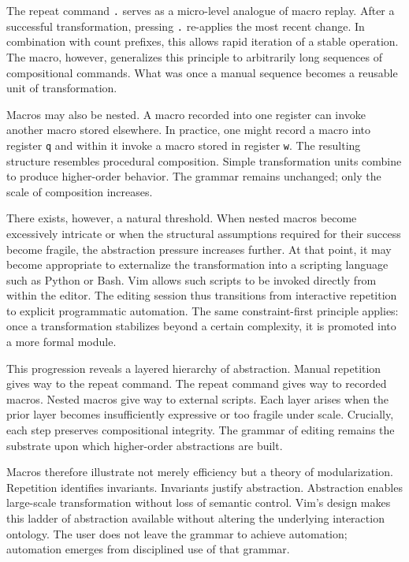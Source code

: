 \documentclass[12pt]{article}
\begin{document}
The repeat command \texttt{.} serves as a micro-level analogue of macro replay. After a successful transformation, pressing \texttt{.} re-applies the most recent change. In combination with count prefixes, this allows rapid iteration of a stable operation. The macro, however, generalizes this principle to arbitrarily long sequences of compositional commands. What was once a manual sequence becomes a reusable unit of transformation.

Macros may also be nested. A macro recorded into one register can invoke another macro stored elsewhere. In practice, one might record a macro into register \texttt{q} and within it invoke a macro stored in register \texttt{w}. The resulting structure resembles procedural composition. Simple transformation units combine to produce higher-order behavior. The grammar remains unchanged; only the scale of composition increases.

There exists, however, a natural threshold. When nested macros become excessively intricate or when the structural assumptions required for their success become fragile, the abstraction pressure increases further. At that point, it may become appropriate to externalize the transformation into a scripting language such as Python or Bash. Vim allows such scripts to be invoked directly from within the editor. The editing session thus transitions from interactive repetition to explicit programmatic automation. The same constraint-first principle applies: once a transformation stabilizes beyond a certain complexity, it is promoted into a more formal module.

This progression reveals a layered hierarchy of abstraction. Manual repetition gives way to the repeat command. The repeat command gives way to recorded macros. Nested macros give way to external scripts. Each layer arises when the prior layer becomes insufficiently expressive or too fragile under scale. Crucially, each step preserves compositional integrity. The grammar of editing remains the substrate upon which higher-order abstractions are built.

Macros therefore illustrate not merely efficiency but a theory of modularization. Repetition identifies invariants. Invariants justify abstraction. Abstraction enables large-scale transformation without loss of semantic control. Vim’s design makes this ladder of abstraction available without altering the underlying interaction ontology. The user does not leave the grammar to achieve automation; automation emerges from disciplined use of that grammar.
\end{document}
